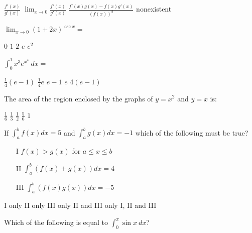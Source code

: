 \begin{questions}
    \begin{oneparchoices}
    \choice $\frac{f'(x)}{g'(x)}$
    \CorrectChoice $\lim_{x \to 0} \frac{f'(x)}{g'(x)}$
    \choice $\frac{f'(x)g(x) - f(x)g'(x)}{(f(x))^2}$
    \choice nonexistent
    \end{oneparchoices}

\question[2] $\lim_{x \to 0} (1 + 2x)^{\csc x} = $

    \begin{oneparchoices}
    \choice $0$
    \choice $1$
    \choice $2$
    \choice $e$
    \CorrectChoice $e^2$
    \end{oneparchoices}

\question[2] $\int_0^1 x^3e^{x^4}\ dx =$

    \begin{oneparchoices}
    \CorrectChoice $\frac{1}{4}(e - 1)$
    \choice $\frac{1}{4}e$
    \choice $e - 1$
    \choice $e$
    \choice $4(e - 1)$
    \end{oneparchoices}

\question[2] The area of the region enclosed by the graphs of $y = x^2$
    and $y = x$ is:

    \begin{oneparchoices}
    \CorrectChoice $\frac{1}{6}$
    \choice $\frac{1}{3}$
    \choice $\frac{1}{2}$
    \choice $\frac{5}{6}$
    \choice $1$
    \end{oneparchoices}

\question[2] If $\int_a^b f(x)dx = 5$ and $\int_a^b g(x)dx = -1$ which
    of the following must be true?
    \begin{enumerate}
    \item[I]   $f(x) > g(x)$ for $a \le x \le b$
    \item[II]  $\int_a^b (f(x) + g(x))dx = 4$
    \item[III] $\int_a^b (f(x)g(x))dx = -5$
    \end{enumerate}

    \begin{oneparchoices}
    \choice I only
    \CorrectChoice II only
    \choice III only
    \choice II and III only
    \choice I, II and III
    \end{oneparchoices}

\question[2] Which of the following is equal to $\int_0^\pi \sin x\ dx$?


\end{questions}
